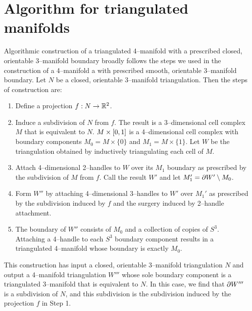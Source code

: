 \chapter{Algorithm for triangulated manifolds}
\label{chapter:triangulation}

Algorithmic construction of a triangulated 4--manifold with a prescribed closed, orientable 3--manifold boundary broadly follows the steps we used in the construction of a 4--manifold a with prescribed smooth, orientable 3--manifold boundary.
Let $N$ be a closed, orientable 3--manifold triangulation.
Then the steps of construction are:
\begin{enumerate}
	\item Define a projection $f:N\to\mathbb{R}^2$.
	
	\item Induce a subdivision of $N$ from $f$.  The result is a 3--dimensional cell complex $M$ that is equivalent to $N$.  $M\times[0,1]$ is a 4--dimensional cell complex with boundary components $M_0 = M\times\{0\}$ and $M_1 = M\times\{1\}$.  Let $W$ be the triangulation obtained by inductively triangulating each cell of $M$.
	
	\item Attach 4--dimensional 2--handles to $W$ over its $M_1$ boundary as prescribed by the subdivision of $M$ from $f$.  Call the result $W'$ and let $M_1'=\partial W' \setminus M_0$.
	
	\item Form $W''$ by attaching 4--dimensional 3--handles to $W'$ over $M_1'$ as prescribed by the subdivision induced by $f$ and the surgery induced by 2--handle attachment.
	
	\item The boundary of $W''$ consists of $M_0$ and a collection of copies of $S^3$. Attaching a 4--handle to each $S^3$ boundary component results in a triangulated 4--manifold whose boundary is exactly $M_0$.
\end{enumerate}

This construction has input a closed, orientable 3--manifold triangulation $N$ and output a 4--manifold triangulation $W'''$ whose sole boundary component is a triangulated 3--manifold that is equivalent to $N$.
In this case, we find that $\partial W'''$ is a subdivision of $N$, and this subdivision is the subdivision induced by the projection $f$ in Step 1.

